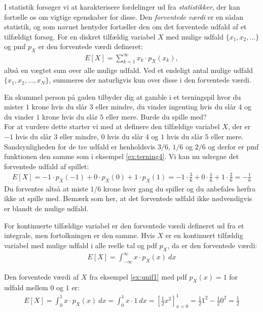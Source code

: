 I statistik forsøger vi at karakterisere fordelinger ud fra \emph{statistikker}, der kan fortælle os om vigtige egenskaber for disse. Den \emph{forventede værdi} er en sådan statistik, og som navnet hentyder fortæller den om det forventede udfald af et tilfældigt forsøg. For en diskret tilfældig variabel  $X$ med mulige udfald $\{x_1,x_2,\dots\}$ og pmf $p_X$ er den forventede værdi defineret:
\begin{align*}
E[X] = \sum_{k=1}^{\infty} x_k\cdot p_X(x_k),
\end{align*}
altså en vægtet sum over alle mulige udfald. Ved et endeligt antal mulige udfald $\{x_1,x_2,\dots,x_N\}$, summeres der naturligvis kun over disse i den forventede værdi. 
\begin{example} \label{ex:game}
En skummel person på gaden tilbyder dig at gamble i et terningspil hvor du mister $1$ krone hvis du slår $3$ eller mindre, du vinder ingenting hvis du slår $4$ og du vinder $1$ krone hvis du slår $5$ eller mere. Burde du spille med? \\
For at vurdere dette starter vi med at definere den tilfældige variabel $X$, der er $-1$ hvis du slår $3$ eller mindre, $0$ hvis du slår $4$ og $1$ hvis du slår $5$ eller mere. Sandsynligheden for de tre udfald er henholdsvis $3/6$, $1/6$ og $2/6$ og derfor er pmf funktionen den samme som i eksempel \ref{ex:terning4}. Vi kan nu udregne det forventede udfald af spillet:
\begin{align*}
E[X] = -1\cdot p_X(-1) + 0\cdot p_X(0) + 1\cdot p_X(1) = -1\cdot \frac{3}{6} + 0\cdot\frac{1}{6} + 1\cdot \frac{2}{6} = -\frac{1}{6}
\end{align*}
Du forventes altså at miste $1/6$ krone hver gang du spiller og du anbefales herfra ikke at spille med. Bemærk som her, at det forventede udfald ikke nødvendigvis er blandt de mulige udfald. 
\end{example}
For kontinuerte tilfældige variabel er den forventede værdi defineret ud fra et integrale, men fortolkningen er den samme. Hvis $X$ er en kontinuert tilfældig variabel med mulige udfald i alle reelle tal og pdf $p_X$, da er den forventede værdi:
\begin{align*}
E[X] = \int_{-\infty}^{\infty} x \cdot p_X(x) \ dx
\end{align*}
\begin{example}
Den forventede værdi af $X$ fra eksempel \ref{ex:unif1} med pdf $p_X(x) = 1$ for udfald mellem $0$ og $1$ er:
\begin{align*}
E[X] = \int_0^1 x \cdot p_X(x) \ dx = \int_0^1 x\cdot 1 \ dx = \left[\frac{1}{2}x^2 \right]_{x=0}^1 = \frac{1}{2}1^2 - \frac{1}{2}0^2 = \frac{1}{2}
\end{align*}
\end{example}
